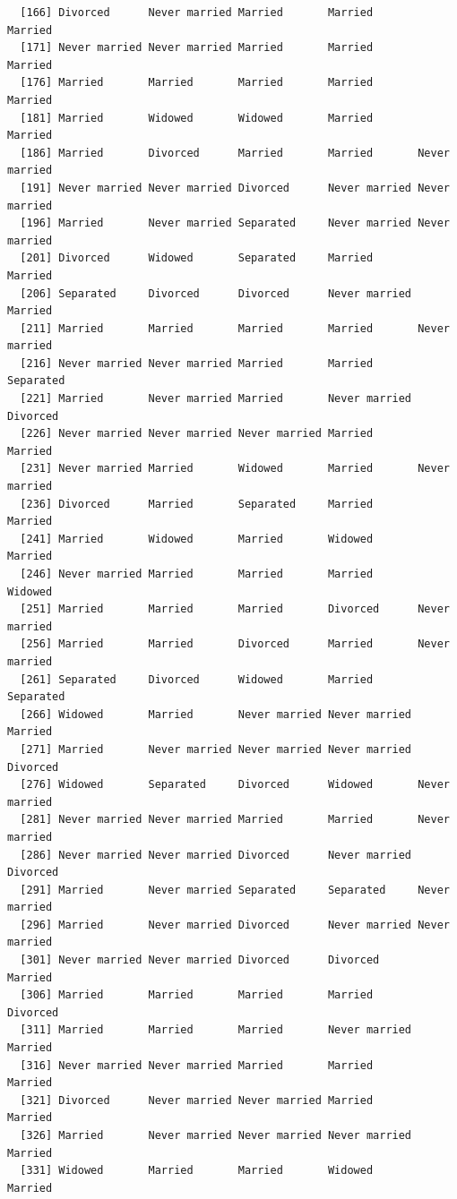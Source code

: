 \documentclass[
  letterpaper,
  DIV=11,
  numbers=noendperiod,
  oneside]{scrartcl}
\begin{document}
\begin{verbatim}
  [166] Divorced      Never married Married       Married       Married      
  [171] Never married Never married Married       Married       Married      
  [176] Married       Married       Married       Married       Married      
  [181] Married       Widowed       Widowed       Married       Married      
  [186] Married       Divorced      Married       Married       Never married
  [191] Never married Never married Divorced      Never married Never married
  [196] Married       Never married Separated     Never married Never married
  [201] Divorced      Widowed       Separated     Married       Married      
  [206] Separated     Divorced      Divorced      Never married Married      
  [211] Married       Married       Married       Married       Never married
  [216] Never married Never married Married       Married       Separated    
  [221] Married       Never married Married       Never married Divorced     
  [226] Never married Never married Never married Married       Married      
  [231] Never married Married       Widowed       Married       Never married
  [236] Divorced      Married       Separated     Married       Married      
  [241] Married       Widowed       Married       Widowed       Married      
  [246] Never married Married       Married       Married       Widowed      
  [251] Married       Married       Married       Divorced      Never married
  [256] Married       Married       Divorced      Married       Never married
  [261] Separated     Divorced      Widowed       Married       Separated    
  [266] Widowed       Married       Never married Never married Married      
  [271] Married       Never married Never married Never married Divorced     
  [276] Widowed       Separated     Divorced      Widowed       Never married
  [281] Never married Never married Married       Married       Never married
  [286] Never married Never married Divorced      Never married Divorced     
  [291] Married       Never married Separated     Separated     Never married
  [296] Married       Never married Divorced      Never married Never married
  [301] Never married Never married Divorced      Divorced      Married      
  [306] Married       Married       Married       Married       Divorced     
  [311] Married       Married       Married       Never married Married      
  [316] Never married Never married Married       Married       Married      
  [321] Divorced      Never married Never married Married       Married      
  [326] Married       Never married Never married Never married Married      
  [331] Widowed       Married       Married       Widowed       Married      

\end{verbatim}
\end{document}
